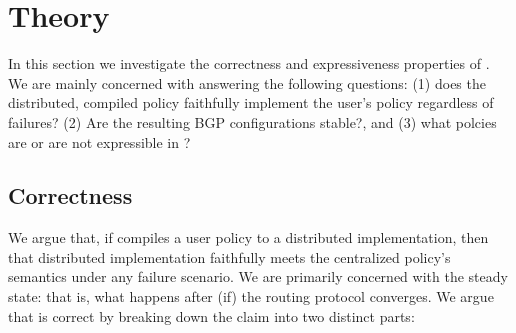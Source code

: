 \section{Theory}

\newtheorem{defn}{Proposition}[section]

In this section we investigate the correctness and expressiveness properties of \sysname. We are mainly concerned with answering the following questions: (1) does the distributed, compiled policy faithfully implement the user's policy regardless of failures? (2) Are the resulting BGP configurations stable?, and (3) what polcies are or are not expressible in \sysname?

%
%
%



\subsection{Correctness}

We argue that, if \sysname compiles a user policy to a distributed implementation, then that distributed implementation faithfully meets the centralized policy's semantics under any failure scenario. We are primarily concerned with the steady state: that is, what happens after (if) the routing protocol converges.  We argue that \sysname is correct by breaking down the claim into two distinct parts:


